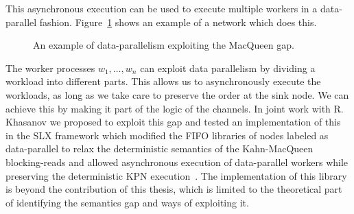 This asynchronous execution can be used to execute multiple workers in a data-parallel fashion.
Figure~\ref{fig:data_parallel_kpn} shows an example of a network which does this.
\begin{figure}[h]
   \resizebox{0.45\textwidth}{!}{}
	\caption{An example of data-parallelism exploiting the MacQueen gap.}
	\label{fig:data_parallel_kpn}
\end{figure}

The worker processes $w_1, \ldots, w_n$ can exploit data parallelism by dividing a workload into different parts. This allows us to asynchronously execute the workloads, as long as we take care to preserve the order at the sink node. 
We can achieve this by making it part of the logic of the channels. In joint work with R. Khasanov we proposed to exploit this gap and tested an implementation of this in the SLX framework which modified the FIFO libraries of nodes labeled as data-parallel to relax the deterministic semantics of the Kahn-MacQueen blocking-reads and allowed asynchronous execution of data-parallel workers while preserving the deterministic \ac{KPN} execution~\cite{khasanov_parmaditam18}. The implementation of this library is beyond the contribution of this thesis, which is limited to the theoretical part of identifying the semantics gap and ways of exploiting it.  


